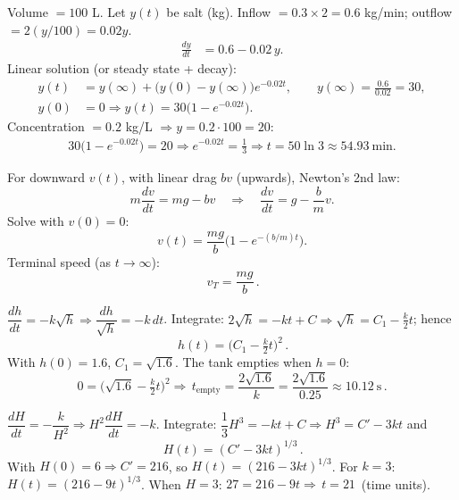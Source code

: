\documentclass[11pt]{article}
\begin{document}
\begin{solution}
Volume $=100$ L. Let $y(t)$ be salt (kg). Inflow $=0.3\times2=0.6$ kg/min; outflow $=2(y/100)=0.02y$.
\begin{align*}
\frac{dy}{dt}&=0.6-0.02\,y.
\end{align*}
Linear solution (or steady state + decay):
\begin{align*}
y(t)&=y(\infty)+\big(y(0)-y(\infty)\big)e^{-0.02t},\qquad
y(\infty)=\frac{0.6}{0.02}=30,\\
y(0)&=0 \Rightarrow y(t)=30\big(1-e^{-0.02t}\big).
\end{align*}
Concentration $=0.2$ kg/L $\Rightarrow y=0.2\cdot100=20$:
\begin{align*}
30\big(1-e^{-0.02t}\big)=20
\Rightarrow e^{-0.02t}=\frac{1}{3}
\Rightarrow t=50\ln 3\approx 54.93\ \text{min}.
\end{align*}
\end{solution}


\begin{solution}
For downward $v(t)$, with linear drag $bv$ (upwards), Newton’s 2nd law:
\[
m\frac{dv}{dt}=mg-bv\quad\Rightarrow\quad \frac{dv}{dt}=g-\frac{b}{m}v.
\]
Solve with $v(0)=0$:
\[
v(t)=\frac{mg}{b}\Big(1-e^{-(b/m)t}\Big).
\]
Terminal speed (as $t\to\infty$):
\[
\boxed{\,v_T=\dfrac{mg}{b}\,}.
\]
\end{solution}

\begin{solution}
$\dfrac{dh}{dt}=-k\sqrt{h}\Rightarrow \dfrac{dh}{\sqrt{h}}=-k\,dt$.
Integrate: $2\sqrt{h}=-kt+C\Rightarrow \sqrt{h}=C_1-\frac{k}{2}t$; hence
\[
\boxed{\,h(t)=\Big(C_1-\tfrac{k}{2}t\Big)^{2}\,}.
\]
With $h(0)=1.6$, $C_1=\sqrt{1.6}$. The tank empties when $h=0$:
\[
0=\Big(\sqrt{1.6}-\tfrac{k}{2}t\Big)^2\Rightarrow 
\boxed{\,t_{\text{empty}}=\frac{2\sqrt{1.6}}{k}
=\frac{2\sqrt{1.6}}{0.25}\approx 10.12\ \text{s}\,}.
\]
\end{solution}

\begin{solution}
$\dfrac{dH}{dt}=-\dfrac{k}{H^{2}}\Rightarrow H^{2}\dfrac{dH}{dt}=-k$.
Integrate: $\dfrac{1}{3}H^{3}=-kt+C\Rightarrow H^{3}=C'-3kt$ and
\[
\boxed{\,H(t)=(C'-3kt)^{1/3}\,}.
\]
With $H(0)=6\Rightarrow C'=216$, so $H(t)=(216-3kt)^{1/3}$.
For $k=3$: $H(t)=(216-9t)^{1/3}$.  When $H=3$:
$27=216-9t\Rightarrow \boxed{\,t=21\,}$ (time units).
\end{solution}
\end{document}

